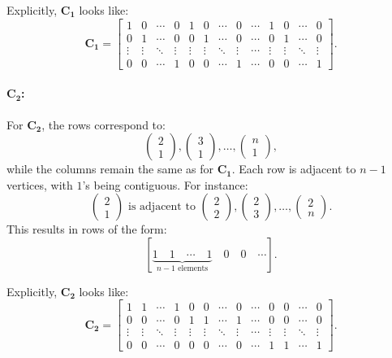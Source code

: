 \documentclass{article}
\begin{document}
Explicitly, \( \mathbf{C_1} \) looks like:
\[
\mathbf{C_1} = 
\begin{bmatrix}
1 & 0 & \cdots & 0 & 1 & 0 & \cdots & 0 & \cdots & 1 & 0 & \cdots & 0 \\
0 & 1 & \cdots & 0 & 0 & 1 & \cdots & 0 & \cdots & 0 & 1 & \cdots & 0 \\
\vdots & \vdots & \ddots & \vdots & \vdots & \vdots & \ddots & \vdots & \cdots & \vdots & \vdots & \ddots & \vdots \\
0 & 0 & \cdots & 1 & 0 & 0 & \cdots & 1 & \cdots & 0 & 0 & \cdots & 1
\end{bmatrix}.
\]

\paragraph{\( \mathbf{C_2} \):}

For \( \mathbf{C_2} \), the rows correspond to:
\[
\begin{pmatrix} 2 \\ 1 \end{pmatrix}, \begin{pmatrix} 3 \\ 1 \end{pmatrix}, \dots, \begin{pmatrix} n \\ 1 \end{pmatrix},
\]
while the columns remain the same as for \( \mathbf{C_1} \). Each row is adjacent to \( n-1 \) vertices, with \( 1 \)'s being contiguous. For instance:
\[
\begin{pmatrix} 2 \\ 1 \end{pmatrix} \text{ is adjacent to } \begin{pmatrix} 2 \\ 2 \end{pmatrix}, \begin{pmatrix} 2 \\ 3 \end{pmatrix}, \dots, \begin{pmatrix} 2 \\ n \end{pmatrix}.
\]
This results in rows of the form:
\[
[\underbrace{1 \quad 1 \quad \cdots \quad 1}_{n-1 \text{ elements}} \quad 0 \quad 0 \quad \cdots].
\]

Explicitly, \( \mathbf{C_2} \) looks like:
\[
\mathbf{C_2} = 
\begin{bmatrix}
1 & 1 & \cdots & 1 & 0 & 0 & \cdots & 0 & \cdots & 0 & 0 & \cdots & 0 \\
0 & 0 & \cdots & 0 & 1 & 1 & \cdots & 1 & \cdots & 0 & 0 & \cdots & 0 \\
\vdots & \vdots & \ddots & \vdots & \vdots & \vdots & \ddots & \vdots & \cdots & \vdots & \vdots & \ddots & \vdots \\
0 & 0 & \cdots & 0 & 0 & 0 & \cdots & 0 & \cdots & 1 & 1 & \cdots & 1
\end{bmatrix}.
\]
\end{document}
